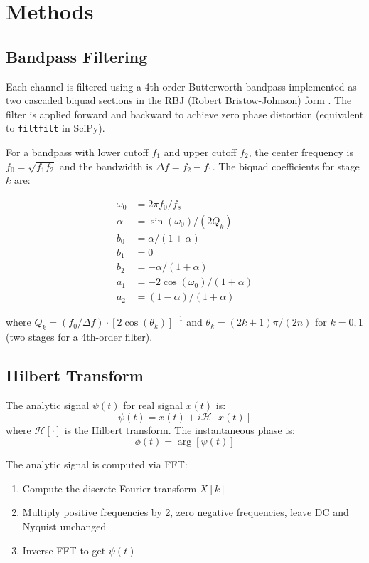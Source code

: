 \documentclass[11pt,a4paper]{article}
\begin{document}
\section{Methods}

\subsection{Bandpass Filtering}

Each channel is filtered using a 4th-order Butterworth bandpass implemented as two cascaded biquad sections in the RBJ (Robert Bristow-Johnson) form \cite{bristowjohnson}. The filter is applied forward and backward to achieve zero phase distortion (equivalent to \texttt{filtfilt} in SciPy).

For a bandpass with lower cutoff $f_1$ and upper cutoff $f_2$, the center frequency is $f_0 = \sqrt{f_1 f_2}$ and the bandwidth is $\Delta f = f_2 - f_1$. The biquad coefficients for stage $k$ are:

\begin{align}
\omega_0 &= 2\pi f_0 / f_s \\
\alpha &= \sin(\omega_0) / (2 Q_k) \\
b_0 &= \alpha / (1 + \alpha) \\
b_1 &= 0 \\
b_2 &= -\alpha / (1 + \alpha) \\
a_1 &= -2 \cos(\omega_0) / (1 + \alpha) \\
a_2 &= (1 - \alpha) / (1 + \alpha)
\end{align}

where $Q_k = (f_0 / \Delta f) \cdot [2 \cos(\theta_k)]^{-1}$ and $\theta_k = (2k+1)\pi / (2n)$ for $k = 0, 1$ (two stages for a 4th-order filter).

\subsection{Hilbert Transform}

The analytic signal $\psi(t)$ for real signal $x(t)$ is:
\begin{equation}
\psi(t) = x(t) + i \mathcal{H}[x(t)]
\end{equation}
where $\mathcal{H}[\cdot]$ is the Hilbert transform. The instantaneous phase is:
\begin{equation}
\phi(t) = \arg[\psi(t)]
\end{equation}

The analytic signal is computed via FFT:
\begin{enumerate}
\item Compute the discrete Fourier transform $X[k]$
\item Multiply positive frequencies by 2, zero negative frequencies, leave DC and Nyquist unchanged
\item Inverse FFT to get $\psi(t)$
\end{enumerate}
\end{document}
